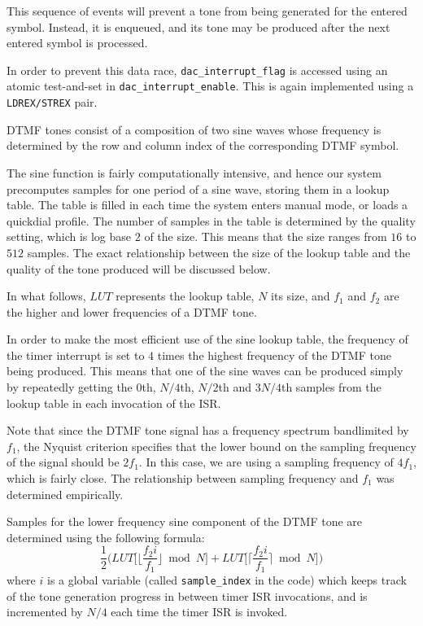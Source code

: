 \documentclass[11pt,a4paper,twocolumn]{scrartcl}
\begin{document}
This sequence of events will prevent a tone from being generated for the entered symbol. Instead, it is enqueued, and its tone may be produced after the next entered symbol is processed.

In order to prevent this data race, \verb!dac_interrupt_flag! is accessed using an atomic test-and-set in \verb!dac_interrupt_enable!. This is again implemented using a \verb!LDREX/STREX! pair.

DTMF tones consist of a composition of two sine waves whose frequency is determined by the row and column index of the corresponding DTMF symbol.

The sine function is fairly computationally intensive, and hence our system precomputes samples for one period of a sine wave, storing them in a lookup table. The table is filled in each time the system enters manual mode, or loads a quickdial profile. The number of samples in the table is determined by the quality setting, which is log base $2$ of the size. This means that the size ranges from $16$ to $512$ samples. The exact relationship between the size of the lookup table and the quality of the tone produced will be discussed below.

In what follows, $LUT$ represents the lookup table, $N$ its size, and $f_1$ and $f_2$ are the higher and lower frequencies of a DTMF tone.

In order to make the most efficient use of the sine lookup table, the frequency of the timer interrupt is set to $4$ times the highest frequency of the DTMF tone being produced. This means that one of the sine waves can be produced simply by repeatedly getting the $0$th, $N/4$th, $N/2$th and $3N/4$th samples from the lookup table in each invocation of the ISR. 

Note that since the DTMF tone signal has a frequency spectrum bandlimited by $f_1$, the Nyquist criterion specifies that the lower bound on the sampling frequency of the signal should be $2f_1$. In this case, we are using a sampling frequency of $4f_1$, which is fairly close. The relationship between sampling frequency and $f_1$ was determined empirically.

Samples for the lower frequency sine component of the DTMF tone are determined using the following formula:
$$ \frac{1}{2}\Bigg(LUT\bigg[\bigg\lfloor\frac{f_2i}{f_1}\bigg\rfloor \bmod N\bigg] + LUT\bigg[\bigg\lceil\frac{f_2i}{f_1}\bigg\rceil \bmod N\bigg]\Bigg) $$
where $i$ is a global variable (called \verb!sample_index! in the code) which keeps track of the tone generation progress in between timer ISR invocations, and is incremented by $N/4$ each time the timer ISR is invoked.
\end{document}
